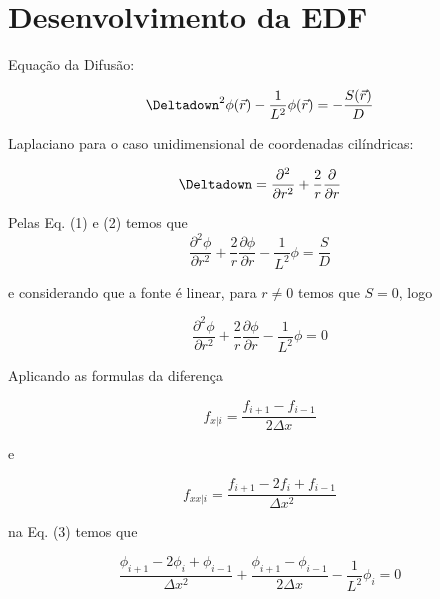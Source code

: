 \documentclass{article}
\begin{document}
    \section{Desenvolvimento da EDF}
        Equação da Difusão:
        
        \begin{equation}
            \Deltadown^2 \phi (\vec r) - \frac{1}{L^2} \phi(\vec r) = - \frac{S(\vec r)}{D}
        \end{equation}
        
        Laplaciano para o caso unidimensional de coordenadas cilíndricas:
        
        \begin{equation}
            \Deltadown =  \frac{\partial^2}{\partial r^2}  + \frac{2}{r} \frac{\partial}{\partial r}
        \end{equation}
        
        Pelas Eq. (1) e (2) temos que
        \begin{equation}
            \frac{\partial^2\phi}{\partial r^2}  + \frac{2}{r} \frac{\partial\phi}{\partial r} - \frac{1}{L^2} \phi = \frac{S}{D}
        \end{equation}

        e considerando que a fonte é linear, para $r \neq 0$ temos que $S = 0$, logo

        \begin{equation}
            \frac{\partial^2\phi}{\partial r^2}  + \frac{2}{r} \frac{\partial\phi}{\partial r} - \frac{1}{L^2} \phi = 0
        \end{equation}
        
        Aplicando as formulas da diferença
        
        \begin{equation}
            f_{x|i} = \frac{f_{i+1} - f_{i-1}}{2 \Delta x} 
        \end{equation}
        
        e
        
        \begin{equation}
            f_{xx|i} = \frac{f_{i+1} - 2 f_i + f_{i-1}}{\Delta x^2} 
        \end{equation}
        
        na Eq. (3) temos que
        
        \begin{equation}
            \frac{\phi_{i+1} - 2 \phi_i + \phi_{i-1}}{\Delta x^2} + \frac{\phi_{i+1} - \phi_{i-1}}{2 \Delta x} - \frac{1}{L^2} \phi_i = 0
        \end{equation}
        
\end{document}
